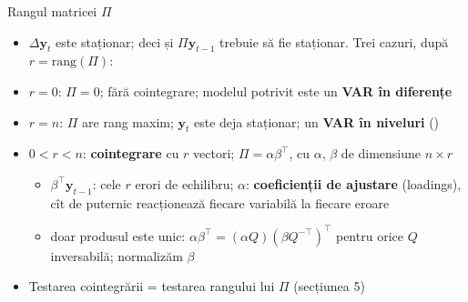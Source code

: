 \begin{frame}{Rangul matricei $\Pi$}
\itemsize{\small}
\begin{itemize}
    \item $\Delta\mathbf y_t$ este staționar; deci și $\Pi\mathbf y_{t-1}$ trebuie să fie staționar. Trei cazuri, după $r = \mathrm{rang}(\Pi)$:
    \item $r = 0$: $\Pi = 0$; fără cointegrare; modelul potrivit este un \textbf{VAR în diferențe}
    \item $r = n$: $\Pi$ are rang maxim; $\mathbf y_t$ este deja staționar; un \textbf{VAR în niveluri} ()
    \item $0 < r < n$: \textbf{cointegrare} cu $r$ vectori; $\Pi = \alpha\beta^\top$, cu $\alpha$, $\beta$ de dimensiune $n \times r$
    \begin{itemize}
        \item $\beta^\top\mathbf y_{t-1}$: cele $r$ erori de echilibru; $\alpha$: \textbf{coeficienții de ajustare} (loadings), cît de puternic reacționează fiecare variabilă la fiecare eroare
        \item doar produsul este unic: $\alpha\beta^\top = (\alpha Q)(\beta Q^{-\top})^\top$ pentru orice $Q$ inversabilă; normalizăm $\beta$
    \end{itemize}
    \item Testarea cointegrării = testarea rangului lui $\Pi$ (secțiunea 5)
\end{itemize}
\end{frame}

